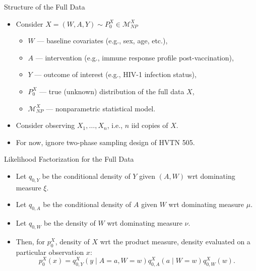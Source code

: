 \documentclass{beamer}
\begin{document}
\begin{frame}[c]{Structure of the Full Data}

\begin{center}
\begin{itemize}
  \itemsep10pt
  \item Consider $X = (W, A, Y) \sim P_0^X \in \mathcal{M}^X_{NP}$
    \begin{itemize}
      \itemsep6pt
      \item $W$ --- baseline covariates (e.g., sex, age, etc.),
      \item $A$ --- intervention (e.g., immune response profile
        post-vaccination),
      \item $Y$ --- outcome of interest (e.g., HIV-1 infection status),
      \item $P_0^X$ --- true (unknown) distribution of the full data $X$,
      \item $\mathcal{M}^X_{NP}$ --- nonparametric statistical model.
    \end{itemize}
  \item Consider observing $X_1, \ldots, X_n$, i.e., $n$ iid copies of $X$.
  \item For now, ignore two-phase sampling design of HVTN 505.
\end{itemize}
\end{center}

\note{
}

\end{frame}


\begin{frame}[c]{Likelihood Factorization for the Full Data}

\begin{center}
\begin{itemize}
  \itemsep10pt
  \item Let $q_{0, Y}$ be the conditional density of $Y$ given $(A, W)$ wrt
    dominating measure $\xi$.
  \item Let $q_{0, A}$ be the conditional density of $A$ given $W$ wrt
    dominating measure $\mu$.
  \item Let $q_{0, W}$ be the density of $W$ wrt dominating measure $\nu$.
  \item Then, for $p_0^X$, density of $X$ wrt the product measure, density
    evaluated on a particular observation $x$:
    \begin{equation*}\label{likelihood_factorization}
       p_0^X(x) = q^X_{0,Y}(y \mid A = a, W = w) q^X_{0,A}(a \mid W = w)
        q^X_{0,W}(w).
     \end{equation*}
\end{itemize}
\end{center}

\note{
}

\end{frame}
\end{document}
